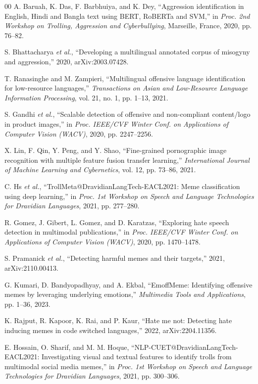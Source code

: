 \documentclass[conference]{IEEEtran}
\begin{document}
\begin{thebibliography}{00}
 A. Baruah, K. Das, F. Barbhuiya, and K. Dey, ``Aggression identification in English, Hindi and Bangla text using BERT, RoBERTa and SVM,'' in \textit{Proc. 2nd Workshop on Trolling, Aggression and Cyberbullying}, Marseille, France, 2020, pp. 76--82.

 S. Bhattacharya \textit{et al.}, ``Developing a multilingual annotated corpus of misogyny and aggression,'' 2020, arXiv:2003.07428.

 T. Ranasinghe and M. Zampieri, ``Multilingual offensive language identification for low-resource languages,'' \textit{Transactions on Asian and Low-Resource Language Information Processing}, vol. 21, no. 1, pp. 1--13, 2021.

 S. Gandhi \textit{et al.}, ``Scalable detection of offensive and non-compliant content/logo in product images,'' in \textit{Proc. IEEE/CVF Winter Conf. on Applications of Computer Vision (WACV)}, 2020, pp. 2247--2256.

 X. Lin, F. Qin, Y. Peng, and Y. Shao, ``Fine-grained pornographic image recognition with multiple feature fusion transfer learning,'' \textit{International Journal of Machine Learning and Cybernetics}, vol. 12, pp. 73--86, 2021.

 C. Hs \textit{et al.}, ``TrollMeta@DravidianLangTech-EACL2021: Meme classification using deep learning,'' in \textit{Proc. 1st Workshop on Speech and Language Technologies for Dravidian Languages}, 2021, pp. 277--280.

 R. Gomez, J. Gibert, L. Gomez, and D. Karatzas, ``Exploring hate speech detection in multimodal publications,'' in \textit{Proc. IEEE/CVF Winter Conf. on Applications of Computer Vision (WACV)}, 2020, pp. 1470--1478.

 S. Pramanick \textit{et al.}, ``Detecting harmful memes and their targets,'' 2021, arXiv:2110.00413.

 G. Kumari, D. Bandyopadhyay, and A. Ekbal, ``EmoffMeme: Identifying offensive memes by leveraging underlying emotions,'' \textit{Multimedia Tools and Applications}, pp. 1--36, 2023.

 K. Rajput, R. Kapoor, K. Rai, and P. Kaur, ``Hate me not: Detecting hate inducing memes in code switched languages,'' 2022, arXiv:2204.11356.

 E. Hossain, O. Sharif, and M. M. Hoque, ``NLP-CUET@DravidianLangTech-EACL2021: Investigating visual and textual features to identify trolls from multimodal social media memes,'' in \textit{Proc. 1st Workshop on Speech and Language Technologies for Dravidian Languages}, 2021, pp. 300--306.


\end{thebibliography}
\end{document}
